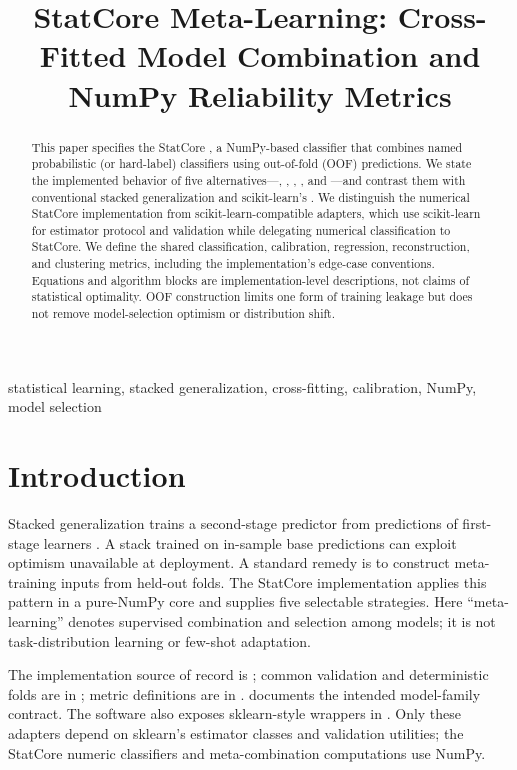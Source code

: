 ﻿\documentclass[conference]{IEEEtran}
\title{StatCore Meta-Learning: Cross-Fitted Model Combination and NumPy Reliability Metrics}
\author{\jabulaniauthor\and\martinchanzauthor\and\oloratoauthor\and\mfundoauthor}
\begin{document}
\maketitle
\begin{abstract}
This paper specifies the StatCore , a NumPy-based classifier that combines named probabilistic (or hard-label) classifiers using out-of-fold (OOF) predictions. We state the implemented behavior of five alternatives---, , , , and ---and contrast them with conventional stacked generalization and scikit-learn's . We distinguish the numerical StatCore implementation from scikit-learn-compatible adapters, which use scikit-learn for estimator protocol and validation while delegating numerical classification to StatCore. We define the shared classification, calibration, regression, reconstruction, and clustering metrics, including the implementation's edge-case conventions. Equations and algorithm blocks are implementation-level descriptions, not claims of statistical optimality. OOF construction limits one form of training leakage but does not remove model-selection optimism or distribution shift.
\end{abstract}
\begin{IEEEkeywords}
statistical learning, stacked generalization, cross-fitting, calibration, NumPy, model selection
\end{IEEEkeywords}

\section{Introduction}
Stacked generalization trains a second-stage predictor from predictions of first-stage learners \cite{wolpert1992,breiman1996}. A stack trained on in-sample base predictions can exploit optimism unavailable at deployment. A standard remedy is to construct meta-training inputs from held-out folds. The StatCore implementation applies this pattern in a pure-NumPy core and supplies five selectable strategies. Here ``meta-learning'' denotes supervised combination and selection among models; it is not task-distribution learning or few-shot adaptation.

The implementation source of record is ; common validation and deterministic folds are in ; metric definitions are in .  documents the intended model-family contract. The software also exposes sklearn-style wrappers in . Only these adapters depend on sklearn's estimator classes and validation utilities; the StatCore numeric classifiers and meta-combination computations use NumPy.
\end{document}
